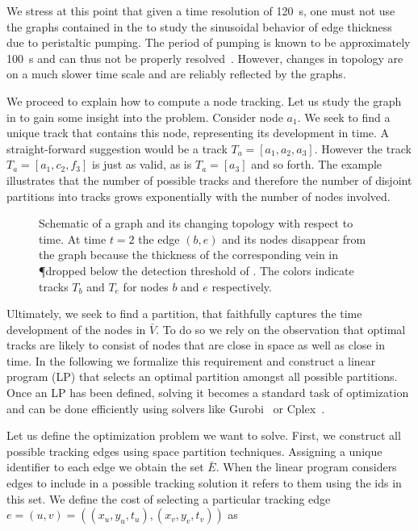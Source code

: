 		We stress at this point that given a time resolution of \SI{120}{\second}, one must not use the graphs contained in the \data to study the sinusoidal behavior of edge thickness due to peristaltic pumping. The period of pumping is known to be approximately \SI{100}{\second} and can thus not be properly resolved~\cite{stewart1959protoplasmic}. However, changes in topology are on a much slower time scale and are reliably reflected by the graphs.

		We proceed to explain how to compute a node tracking. Let us study the graph in  to gain some insight into the problem. Consider \eg node $a_1$. We seek to find a unique track that contains this node, representing its development in time. A straight-forward suggestion would be a track $T_a = [a_1,a_2,a_3]$. However the track $T_a = [a_1,c_2,f_3]$ is just as valid, as is $T_a = [a_3]$ and so forth. The example illustrates that the number of possible tracks and therefore the number of disjoint partitions into tracks grows exponentially with the number of nodes involved. 


		\begin{figure}
		
		
		
		\caption[Schematic description of node tracking.]{Schematic of a graph and its changing topology with respect to time. At time $t=2$ the edge $(b,e)$ and its nodes disappear from the graph because the thickness of the corresponding vein in \P dropped below the detection threshold of \NEFI. The colors indicate tracks $T_b$ and $T_e$ for nodes $b$ and $e$ respectively.}
		\label{fig:tracking}
		\end{figure}

		Ultimately, we seek to find a partition, that faithfully captures the time development of the nodes in $\bar{V}$. To do so we rely on the observation that optimal tracks are likely to consist of nodes that are close in space as well as close in time. In the following we formalize this requirement and construct a linear program (LP) that selects an optimal partition amongst all possible partitions. Once an LP has been defined, solving it becomes a standard task of optimization and can be done efficiently using solvers like Gurobi~\cite{optimization2012gurobi} or Cplex~\cite{cplex2005high}.

		Let us define the optimization problem we want to solve. First, we construct all possible tracking edges using space partition techniques. Assigning a unique identifier to each edge we obtain the set $\bar{E}$. When the linear program considers edges to include in a possible tracking solution it refers to them using the ids in this set. We define the cost of selecting a particular tracking edge $e = (u,v) = ((x_u,y_u,t_u), (x_v,y_v,t_v))$ as

